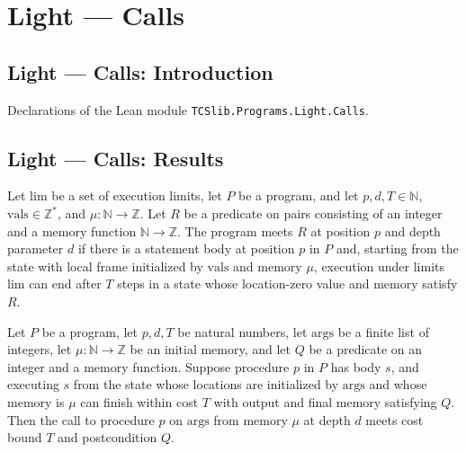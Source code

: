 \section{Light --- Calls}
\subsection*{Light --- Calls: Introduction}

Declarations of the Lean module \texttt{TCSlib.Programs.Light.Calls}.

\subsection*{Light --- Calls: Results}

\begin{definition}
\label{Light.Meets}
\leanok
{}
Let $\mathrm{lim}$ be a set of execution limits, let $P$ be a program, and let
$p,d,T\in\mathbb N$, $\mathrm{vals}\in\mathbb Z^{*}$, and $\mu:\mathbb N\to\mathbb Z$.
Let $R$ be a predicate on pairs consisting of an integer and a memory function $\mathbb
N\to\mathbb Z$. The program meets $R$ at position $p$ and depth parameter $d$ if there
is a statement body at position $p$ in $P$ and, starting from the state with local frame
initialized by $\mathrm{vals}$ and memory $\mu$, execution under limits $\mathrm{lim}$
can end after $T$ steps in a state whose location-zero value and memory satisfy $R$.
\end{definition}

\begin{theorem}
\label{Light.Meets.of_body}
\leanok
{}
Let $P$ be a program, let $p,d,T$ be natural numbers, let $\mathrm{args}$ be a finite
list of integers, let $\mu : \mathbb{N}\to\mathbb{Z}$ be an initial memory, and let $Q$
be a predicate on an integer and a memory function. Suppose procedure $p$ in $P$ has
body $s$, and executing $s$ from the state whose locations are initialized by
$\mathrm{args}$ and whose memory is $\mu$ can finish within cost $T$ with output and
final memory satisfying $Q$. Then the call to procedure $p$ on $\mathrm{args}$ from
memory $\mu$ at depth $d$ meets cost bound $T$ and postcondition $Q$.
\end{theorem}

